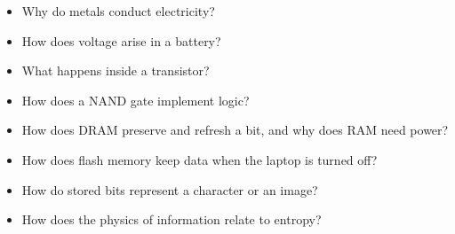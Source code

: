 \begin{itemize}
\item Why do metals conduct electricity?
\item How does voltage arise in a battery?
\item What happens inside a transistor?
\item How does a NAND gate implement logic?
\item How does DRAM preserve and refresh
a bit, and why does RAM need power?
\item How does flash memory keep data
when the laptop is turned off?
\item How do stored bits represent a
character or an image?
\item How does the physics of information
relate to entropy?
\end{itemize}





